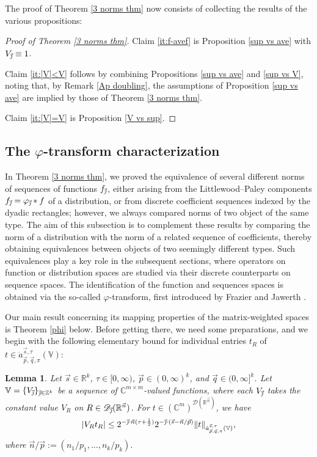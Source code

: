\documentclass[11pt, reqno]{amsart}
\newtheorem{lemma}[theorem]{Lemma}
\theoremstyle{definition}
\theoremstyle{remark}
\numberwithin{equation}{section}
\newcommand{\C}{\mathbb C}
\newcommand{\D}{\mathscr D}
\newcommand{\R}{\mathbb R}
\newcommand{\V}{\mathbb V}
\newcommand{\Z}{\mathbb Z}
\newcommand{\vj}{\vec{\textit{\j}}}
\newcommand{\vn}{\vec n}
\newcommand{\vp}{\vec p}
\newcommand{\vq}{\vec q}
\newcommand{\vs}{\vec s}
\newcommand{\atau}{\dot a^{\vs,\tau}_{\vp,\vq,\pi}}
\newcommand{\abs}[1]{|#1|}
\newcommand{\Norm}[2]{\|#1\|_{#2}}
\begin{document}
The proof of Theorem \ref{3 norms thm} now consists of collecting the results of the various propositions:

\begin{proof}[Proof of Theorem \ref{3 norms thm}]
  Claim \eqref{it:f-avef} is Proposition \ref{sup vs ave} with $V_{\vj}\equiv1$.

  Claim \eqref{it:[V]<V} follows by combining Propositions \ref{sup vs ave} and \ref{sup vs V}, noting that, by Remark \ref{Ap doubling}, the assumptions of Proposition \ref{sup vs ave} are implied by those of Theorem \ref{3 norms thm}.

  Claim \eqref{it:[V]=V} is Proposition \ref{V vs sup}.
\end{proof}

\subsection{The $\varphi$-transform characterization}
\label{phi-transform}

In Theorem \ref{3 norms thm}, we proved the equivalence of several different norms of sequences of functions $f_{\vj}$, either arising from the Littlewood--Paley components $f_{\vj}=\varphi_{\vj}*f$ of a distribution, or from discrete coefficient sequences indexed by the dyadic rectangles; however, we always compared norms of two object of the same type. The aim of this subsection is to complement these results by comparing the norm of a distribution with the norm of a related sequence of coefficients, thereby obtaining equivalences between objects of two seemingly different types. Such equivalences play a key role in the subsequent sections, where operators on function or distribution spaces are studied via their discrete counterparts on sequence spaces. The identification of the function and sequences spaces is obtained via the so-called $\varphi$-transform, first introduced by Frazier and Jawerth \cite{FJ90}.

Our main result concerning its mapping properties of the matrix-weighted spaces is Theorem \ref{phi} below. Before getting there, we need some preparations, and we begin with the following elementary bound for individual entries $t_R$ of $t\in\atau(\V)$:

\begin{lemma}\label{one coef}
Let $\vs\in\R^k$, $\tau\in[0,\infty)$, $\vp\in(0,\infty)^k$, and $\vq\in(0,\infty]^k$.
Let $\V=\{V_{\vj}\}_{\vj\in\Z^k}$ be a sequence of $\C^{m\times m}$-valued functions,
where each $V_{\vj}$ takes the constant value $V_R$ on $R\in\D_{\vj}(\R^{\vn})$. For $t\in(\C^m)^{\D(\R^{\vn})}$, we have
\begin{equation*}
\abs{V_R t_R}
\leq 2^{-\vj\cdot\vn(\tau+\frac12)}
2^{-\vj\cdot(\vs-\vn/\vp)}
\Norm{t}{\atau(\V)},
\end{equation*}
where $  \vn/\vp:=(n_1/p_1,\ldots,n_k/p_k).$
\end{lemma}
\end{document}
